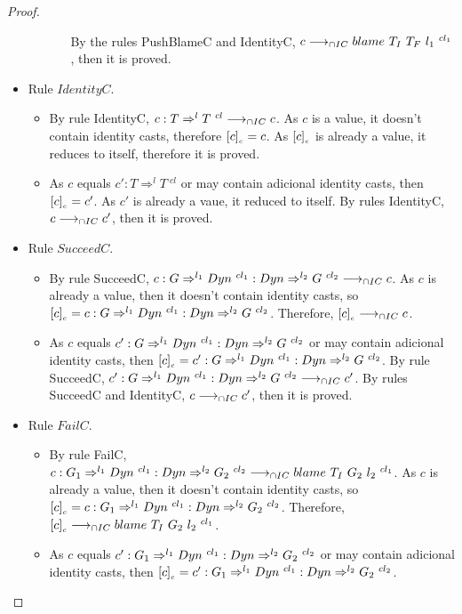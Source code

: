 \documentclass[a4paper]{article}
\begin{document}
\begin{proof}
\begin{itemize}
\begin{itemize}
\begin{itemize}
            By the rules PushBlameC and IdentityC, $c \longrightarrow_{\cap IC} blame\ T_I\ T_F\ l_1\ ^{cl_1}$, then it is proved.
        \end{itemize}
    \end{itemize}
    \item Rule $IdentityC$.
    \begin{itemize}
        \item By rule IdentityC, $c : T \Rightarrow^l T\ ^{cl} \longrightarrow_{\cap IC} c$.
        As $c$ is a value, it doesn't contain identity casts, therefore $[c]_{_c} = c$.
        As $[c]_{_c}$ is already a value, it reduces to itself, therefore it is proved.
        \item As $c$ equals $c' : T \Rightarrow^l T\ ^{cl}$ or may contain adicional identity casts, then $[c]_{_c} = c'$.
        As $c'$ is already a vaue, it reduced to itself.
        By rules IdentityC, $c \longrightarrow_{\cap IC} c'$, then it is proved.
    \end{itemize}
    \item Rule $SucceedC$.
    \begin{itemize}
        \item By rule SucceedC, $c : G \Rightarrow^{l_1} Dyn\ ^{cl_1} : Dyn \Rightarrow^{l_2} G\ ^{cl_2} \longrightarrow_{\cap IC} c$.
        As $c$ is already a value, then it doesn't contain identity casts, so $[c]_{_c} = c : G \Rightarrow^{l_1} Dyn\ ^{cl_1} : Dyn \Rightarrow^{l_2} G\ ^{cl_2}$.
        Therefore, $[c]_{_c} \longrightarrow_{\cap IC} c$.
        \item As $c$ equals $c' : G \Rightarrow^{l_1} Dyn\ ^{cl_1} : Dyn \Rightarrow^{l_2} G\ ^{cl_2}$ or may contain adicional identity casts, then $\erasec{c} = c' : G \Rightarrow^{l_1} \Dyn\ ^{cl_1} : \Dyn \Rightarrow^{l_2} G\ ^{cl_2}$.
        By rule SucceedC, $c' : G \Rightarrow^{l_1} Dyn\ ^{cl_1} : Dyn \Rightarrow^{l_2} G\ ^{cl_2} \longrightarrow_{\cap IC} c'$.
        By rules SucceedC and IdentityC, $c \longrightarrow_{\cap IC} c'$, then it is proved.
    \end{itemize}
    \item Rule $FailC$.
    \begin{itemize}
        \item By rule FailC, $c : G_1 \Rightarrow^{l_1} Dyn\ ^{cl_1} : Dyn \Rightarrow^{l_2} G_2\ ^{cl_2} \longrightarrow_{\cap IC} blame\ T_I\ G_2\ l_2\ ^{cl_1}$.
        As $c$ is already a value, then it doesn't contain identity casts, so $\erasec{c} = c : G_1 \Rightarrow^{l_1} \Dyn\ ^{cl_1} : \Dyn \Rightarrow^{l_2} G_2\ ^{cl_2}$.
        Therefore, $[c]_{_c} \longrightarrow_{\cap IC} blame\ T_I\ G_2\ l_2\ ^{cl_1}$.
        \item As $c$ equals $c' : G_1 \Rightarrow^{l_1} \Dyn\ ^{cl_1} : \Dyn \Rightarrow^{l_2} G_2\ ^{cl_2}$ or may contain adicional identity casts, then $\erasec{c} = c' : G_1 \Rightarrow^{l_1} \Dyn\ ^{cl_1} : \Dyn \Rightarrow^{l_2} G_2\ ^{cl_2}$.

\end{itemize}
\end{itemize}
\end{proof}
\end{document}
